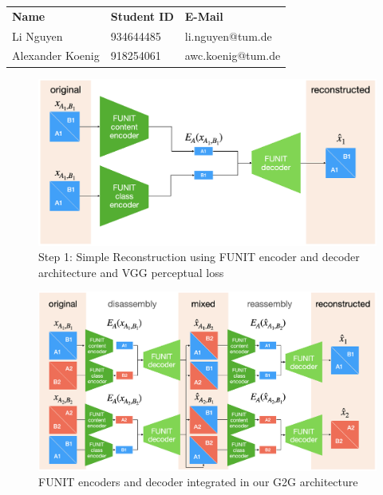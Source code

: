 \documentclass{article}
\begin{document}
\begin{table}[!h]
\center
\begin{tabular}{|l|l|l|}
\hline
\textbf{Name}             & \textbf{Student ID} & \textbf{E-Mail}            \\ \hhline{|=|=|=|}
Li Nguyen        & 934644485  & li.nguyen@tum.de  \\ \hline
Alexander Koenig & 918254061  & awc.koenig@tum.de \\ \hline
\end{tabular}
\end{table}

\begin{figure}[h!]
	\centering 
	\includegraphics[width=1.0\linewidth]{figures/step1.png}
	\caption{Step 1: Simple Reconstruction using FUNIT encoder and decoder architecture and VGG perceptual loss}
	\label{fig:step1}
\end{figure}

\begin{figure}[ht]
	\centering 
	\includegraphics[width=0.95\linewidth]{figures/step2.png}
	\caption{FUNIT encoders and decoder integrated in our G2G architecture}
	\label{fig:step2}
\end{figure}
\end{document}
